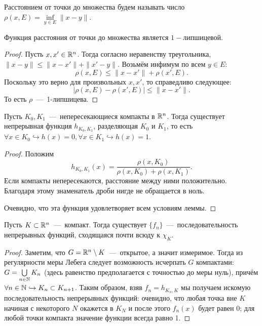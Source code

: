 \begin{reminder}
    Расстоянием от точки до множества будем называть число $\rho(x, E) = \inf\limits_{y \in E} \|x - y\|$.
\end{reminder}

\begin{lemma}
    Функция расстояния от точки до множества является $1-$липшицевой.
\end{lemma}
\begin{proof}
    Пусть $x, x' \in \mathbb{R}^n$. Тогда согласно неравенству треугольника, $\|x - y\| \leq \|x - x'\| + \|x' - y\|$.
    Возьмём инфимум по всем $y \in E:$ \[\rho(x, E) \leq \|x - x'\| + \rho(x', E).\]
    Поскольку это верно для произвольных $x, x'$, то справедливо следующее: \[|\rho(x, E) - \rho(x', E)| \leq \|x - x'\|.\]
    То есть $\rho$~---~1-липшицева.
\end{proof}

\begin{lemma}
    Пусть $K_0, K_1$~---~непересекающиеся компакты в $\mathbb{R}^n$. Тогда существует непрерывная функция $h_{K_0, K_1}$, разделяющая $K_0$ и $K_1$, то есть $\forall x \in K_0 \hookrightarrow h(x) = 0, \forall x \in K_1 \hookrightarrow h(x) = 1$.
\end{lemma}
\begin{proof}
    Положим \[h_{K_0, K_1}(x) = \dfrac{\rho(x, K_0)}{\rho(x, K_0) + \rho(x, K_1)}.\]
    Если компакты непересекаются, расстояние между ними положительно. Благодаря этому знаменатель дроби нигде не обращается в ноль.
    
    Очевидно, что эта функция удовлетворяет всем условиям леммы.
\end{proof}

\begin{theorem}
    Пусть $K \subset \mathbb{R}^n$~---~компакт. Тогда существует $\{f_n\}$~---~последовательность непрерывных функций, сходящаяся почти всюду к $\chi_K$.
\end{theorem}
\begin{proof}
    Заметим, что $G = \mathbb{R}^n \setminus K$~---~открытое, а значит измеримое. Тогда из регулярности меры Лебега следует возможность исчерпать $G$ компактами: $G = \bigcup\limits_{n \in \mathbb{N}} K_n$ (здесь равенство предполагается с точностью до меры нуль), причём $\forall n \in \mathbb{N} \hookrightarrow K_n \subset K_{n + 1}$. Таким образом, взяв $f_n = h_{K_n, K}$ мы получаем искомую последовательность непрерывных функций: очевидно, что любая точка вне $K$ начиная с некоторого $N$ окажется в $K_N$ и после этого $f_n(x)$ будет равен 0; для любой точки компакта значение функции всегда равно 1.
\end{proof}



